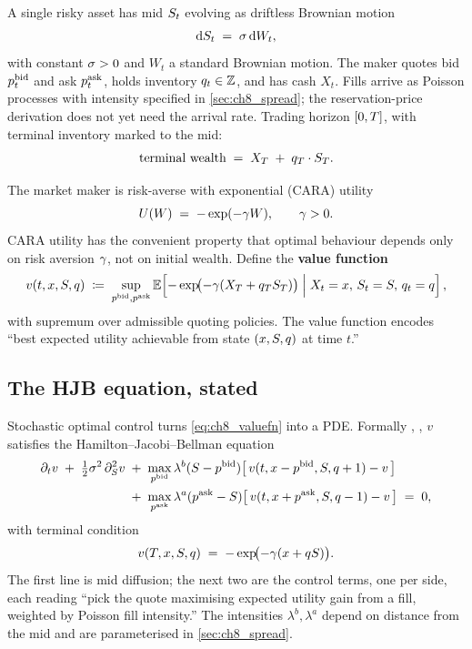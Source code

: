 A single risky asset has mid $S_t$ evolving as driftless
Brownian motion
\begin{equation}
  \mathrm{d}S_t \;=\; \sigma \, \mathrm{d}W_t,
  \label{eq:ch8_sde}
\end{equation}
with constant $\sigma > 0$ and $W_t$ a standard Brownian motion.
The maker quotes bid $p^{\mathrm{bid}}_t$ and ask $p^{\mathrm{ask}}_t$, holds inventory
$q_t \in \mathbb{Z}$, and has cash $X_t$. Fills arrive as Poisson
processes with intensity specified in \cref{sec:ch8_spread}; the
reservation-price derivation does not yet need the arrival rate.
Trading horizon $[0, T]$, with terminal inventory marked to the
mid:
\begin{equation}
  \text{terminal wealth}
  \;=\; X_T \;+\; q_T \cdot S_T.
\end{equation}

The market maker is risk-averse with exponential (CARA) utility
\begin{equation}
  U(W) \;=\; -\exp(-\gamma W),
  \qquad \gamma > 0.
\end{equation}
CARA utility has the convenient property that optimal behaviour
depends only on risk aversion $\gamma$, not on initial wealth.
Define the \textbf{value function}
\begin{equation}
  v(t, x, S, q)
  \;\coloneqq\; \sup_{p^{\mathrm{bid}}, p^{\mathrm{ask}}}
    \mathbb{E}\!\left[ -\exp\!\bigl(-\gamma (X_T + q_T S_T)\bigr)
       \;\Big|\; X_t = x,\, S_t = S,\, q_t = q \right],
  \label{eq:ch8_valuefn}
\end{equation}
with supremum over admissible quoting policies. The value function
encodes ``best expected utility achievable from state
$(x, S, q)$ at time $t$.''

\subsection{The HJB equation, stated}
\label{subsec:ch8_hjb}

Stochastic optimal control turns \eqref{eq:ch8_valuefn} into a PDE.
Formally , , $v$ satisfies the
Hamilton--Jacobi--Bellman equation
\begin{align}
  \partial_t v
  \;+\;\tfrac{1}{2}\sigma^2 \, \partial_S^2 v
  \;&+\; \max_{p^{\mathrm{bid}}}
      \lambda^b(S - p^{\mathrm{bid}})\bigl[\,v(t, x - p^{\mathrm{bid}}, S, q + 1) - v\,\bigr]
  \nonumber \\
  \;&+\; \max_{p^{\mathrm{ask}}}
      \lambda^a(p^{\mathrm{ask}} - S)\bigl[\,v(t, x + p^{\mathrm{ask}}, S, q - 1) - v\,\bigr]
  \;=\; 0,
  \label{eq:ch8_hjb}
\end{align}
with terminal condition
\begin{equation}
  v(T, x, S, q)
  \;=\; -\exp\!\bigl(-\gamma (x + q S)\bigr).
  \label{eq:ch8_terminal}
\end{equation}
The first line is mid diffusion; the next two are the control
terms, one per side, each reading ``pick the quote maximising
expected utility gain from a fill, weighted by Poisson fill
intensity.'' The intensities $\lambda^b, \lambda^a$ depend on
distance from the mid and are parameterised in
\cref{sec:ch8_spread}.

